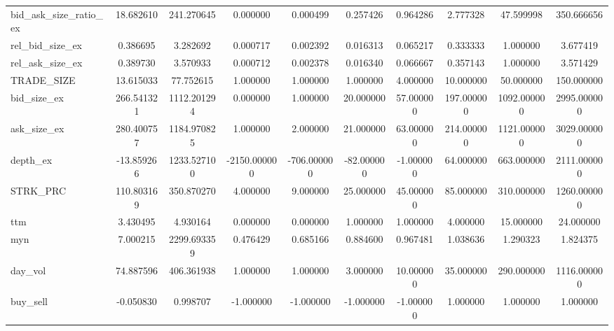 \begin{table}
\begin{tabular}{lSSSSSSSSS}
bid\_ask\_size\_ratio\_ex & 18.682610 & 241.270645 & 0.000000 & 0.000499 & 0.257426 & 0.964286 & 2.777328 & 47.599998 & 350.666656 \\
rel\_bid\_size\_ex & 0.386695 & 3.282692 & 0.000717 & 0.002392 & 0.016313 & 0.065217 & 0.333333 & 1.000000 & 3.677419 \\
rel\_ask\_size\_ex & 0.389730 & 3.570933 & 0.000712 & 0.002378 & 0.016340 & 0.066667 & 0.357143 & 1.000000 & 3.571429 \\
TRADE\_SIZE & 13.615033 & 77.752615 & 1.000000 & 1.000000 & 1.000000 & 4.000000 & 10.000000 & 50.000000 & 150.000000 \\
bid\_size\_ex & 266.541321 & 1112.201294 & 0.000000 & 1.000000 & 20.000000 & 57.000000 & 197.000000 & 1092.000000 & 2995.000000 \\
ask\_size\_ex & 280.400757 & 1184.970825 & 1.000000 & 2.000000 & 21.000000 & 63.000000 & 214.000000 & 1121.000000 & 3029.000000 \\
depth\_ex & -13.859266 & 1233.527100 & -2150.000000 & -706.000000 & -82.000000 & -1.000000 & 64.000000 & 663.000000 & 2111.000000 \\
STRK\_PRC & 110.803169 & 350.870270 & 4.000000 & 9.000000 & 25.000000 & 45.000000 & 85.000000 & 310.000000 & 1260.000000 \\
ttm & 3.430495 & 4.930164 & 0.000000 & 0.000000 & 1.000000 & 1.000000 & 4.000000 & 15.000000 & 24.000000 \\
myn & 7.000215 & 2299.693359 & 0.476429 & 0.685166 & 0.884600 & 0.967481 & 1.038636 & 1.290323 & 1.824375 \\
day\_vol & 74.887596 & 406.361938 & 1.000000 & 1.000000 & 3.000000 & 10.000000 & 35.000000 & 290.000000 & 1116.000000 \\
buy\_sell & -0.050830 & 0.998707 & -1.000000 & -1.000000 & -1.000000 & -1.000000 & 1.000000 & 1.000000 & 1.000000 \\
\bottomrule
\end{tabular}
\end{table}
